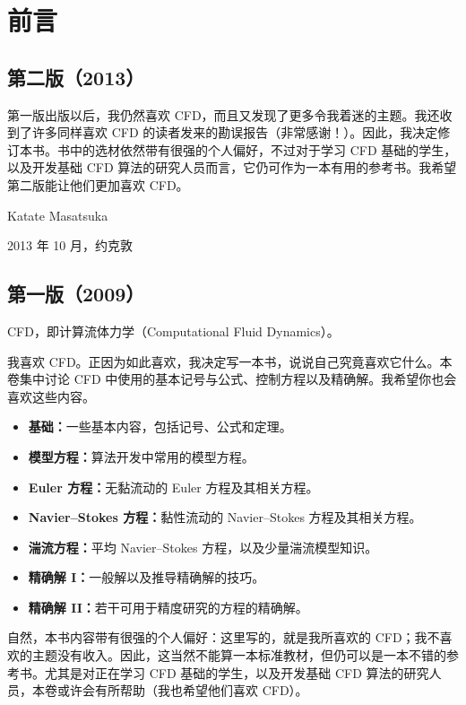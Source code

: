 \documentclass[11pt,a4paper,openany,fontset=none]{ctexbook}
\begin{document}
\chapter*{前言}

\section*{第二版（2013）}

第一版出版以后，我仍然喜欢 CFD，而且又发现了更多令我着迷的主题。我还收到了许多同样喜欢 CFD 的读者发来的勘误报告（非常感谢！）。因此，我决定修订本书。书中的选材依然带有很强的个人偏好，不过对于学习 CFD 基础的学生，以及开发基础 CFD 算法的研究人员而言，它仍可作为一本有用的参考书。我希望第二版能让他们更加喜欢 CFD。

\begin{flushright}
Katate Masatsuka\par
2013 年 10 月，约克敦
\end{flushright}

\section*{第一版（2009）}

CFD，即计算流体力学（Computational Fluid Dynamics）。

我喜欢 CFD。正因为如此喜欢，我决定写一本书，说说自己究竟喜欢它什么。本卷集中讨论 CFD 中使用的基本记号与公式、控制方程以及精确解。我希望你也会喜欢这些内容。

\begin{itemize}
  \item \textbf{基础：}一些基本内容，包括记号、公式和定理。
  \item \textbf{模型方程：}算法开发中常用的模型方程。
  \item \textbf{Euler 方程：}无黏流动的 Euler 方程及其相关方程。
  \item \textbf{Navier--Stokes 方程：}黏性流动的 Navier--Stokes 方程及其相关方程。
  \item \textbf{湍流方程：}平均 Navier--Stokes 方程，以及少量湍流模型知识。
  \item \textbf{精确解 I：}一般解以及推导精确解的技巧。
  \item \textbf{精确解 II：}若干可用于精度研究的方程的精确解。
\end{itemize}

自然，本书内容带有很强的个人偏好：这里写的，就是我所喜欢的 CFD；我不喜欢的主题没有收入。因此，这当然不能算一本标准教材，但仍可以是一本不错的参考书。尤其是对正在学习 CFD 基础的学生，以及开发基础 CFD 算法的研究人员，本卷或许会有所帮助（我也希望他们喜欢 CFD）。
\end{document}

